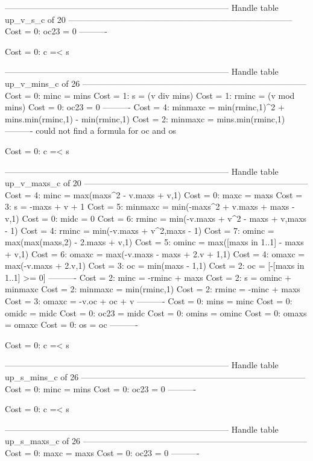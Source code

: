 --------------------------------------------------------------------------------
Handle table up_v_s_c of 20
--------------------------------------------------------------------------------
Cost =  0:  oc23 = 0
----------

Cost =  0:  c =< s

--------------------------------------------------------------------------------
Handle table up_v_mins_c of 26
--------------------------------------------------------------------------------
Cost =  0:  minc    = mins
Cost =  1:  s       = (v div mins)
Cost =  1:  rminc   = (v mod mins)
Cost =  0:  oc23    = 0
----------
Cost =  4:  minmaxc = min(rminc,1)^2 + mins.min(rminc,1) - min(rminc,1)
Cost =  2:  minmaxc = mins.min(rminc,1)
----------
could not find a formula for oc and os

Cost =  0:  c =< s

--------------------------------------------------------------------------------
Handle table up_v_maxs_c of 20
--------------------------------------------------------------------------------
Cost =  4:  minc    = max(maxs^2 - v.maxs + v,1)
Cost =  0:  maxc    = maxs
Cost =  3:  s       = -maxs + v + 1
Cost =  5:  minmaxc = min(-maxs^2 + v.maxs + maxs - v,1)
Cost =  0:  midc    = 0
Cost =  6:  rminc   = min(-v.maxs + v^2 - maxs + v,maxs - 1)
Cost =  4:  rminc   = min(-v.maxs + v^2,maxs - 1)
Cost =  7:  ominc   = max(max(maxs,2) - 2.maxs + v,1)
Cost =  5:  ominc   = max([maxs in 1..1] - maxs + v,1)
Cost =  6:  omaxc   = max(-v.maxs - maxs + 2.v + 1,1)
Cost =  4:  omaxc   = max(-v.maxs + 2.v,1)
Cost =  3:  oc      = min(maxs - 1,1)
Cost =  2:  oc      = [-[maxs in 1..1] >= 0]
----------
Cost =  2:  minc    = -rminc + maxs
Cost =  2:  s       = ominc + minmaxc
Cost =  2:  minmaxc = min(rminc,1)
Cost =  2:  rminc   = -minc + maxs
Cost =  3:  omaxc   = -v.oc + oc + v
----------
Cost =  0:  mins    = minc
Cost =  0:  omidc   = midc
Cost =  0:  oc23    = midc
Cost =  0:  omins   = ominc
Cost =  0:  omaxs   = omaxc
Cost =  0:  os      = oc
----------

Cost =  0:  c =< s

--------------------------------------------------------------------------------
Handle table up_s_mins_c of 26
--------------------------------------------------------------------------------
Cost =  0:  minc = mins
Cost =  0:  oc23 = 0
----------

Cost =  0:  c =< s

--------------------------------------------------------------------------------
Handle table up_s_maxs_c of 26
--------------------------------------------------------------------------------
Cost =  0:  maxc = maxs
Cost =  0:  oc23 = 0
----------

